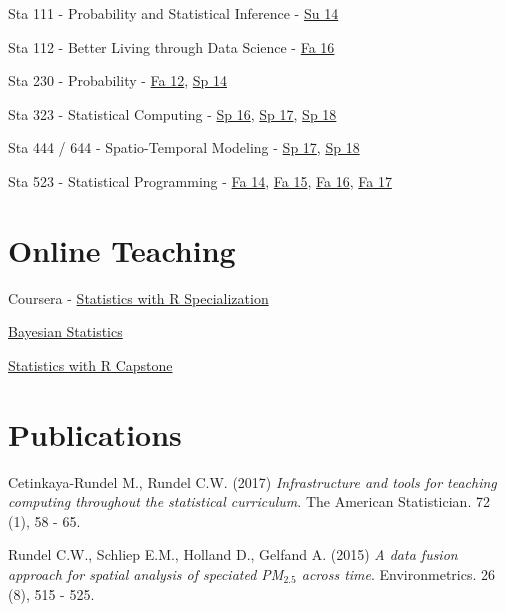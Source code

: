 \documentclass[margin,line]{res}
\begin{document}
\begin{resume}
Sta 111 - Probability and Statistical Inference - \href{https://stat.duke.edu/~cr173/Sta111_Su14/}{Su 14}

Sta 112 - Better Living through Data Science - \href{http://stat.duke.edu/~cr173/Sta112_Fa16/}{Fa 16}

Sta 230 - Probability - \href{http://stat.duke.edu/courses/Spring12/sta104.1}{Fa 12}, \href{https://stat.duke.edu/~cr173/Sta230_Sp14/}{Sp 14}

Sta 323 - Statistical Computing - \href{http://stat.duke.edu/~cr173/Sta323_Sp16/}{Sp 16}, \href{http://stat.duke.edu/~cr173/Sta323_Sp17/}{Sp 17}, \href{http://stat.duke.edu/~cr173/Sta323_Sp18/}{Sp 18}

Sta 444 / 644 - Spatio-Temporal Modeling - \href{http://stat.duke.edu/~cr173/Sta444_Sp17/}{Sp 17}, \href{http://stat.duke.edu/~cr173/Sta444_Sp18/}{Sp 18}

Sta 523 - Statistical Programming - \href{https://stat.duke.edu/~cr173/Sta523_Fa14/}{Fa 14}, \href{https://stat.duke.edu/~cr173/Sta523_Fa15/}{Fa 15}, \href{https://stat.duke.edu/~cr173/Sta523_Fa16/}{Fa 16}, \href{https://stat.duke.edu/~cr173/Sta523_Fa17/}{Fa 17}


\pagebreak


\section{\sc Online Teaching}

Coursera - \href{https://www.coursera.org/specializations/statistics}{Statistics with R Specialization}
\begin{list1}
\item[] \href{https://www.coursera.org/learn/bayesian}{Bayesian Statistics}
\item[] \href{https://www.coursera.org/learn/statistics-project}{Statistics with R Capstone}
\end{list1}

\section{\sc Publications}

Cetinkaya-Rundel M., Rundel C.W. (2017) {\em Infrastructure and tools for teaching computing throughout the statistical curriculum}. The American Statistician. 72 (1), 58 - 65.

\vspace{-0.15cm}
Rundel C.W., Schliep E.M., Holland D., Gelfand A. (2015) {\em A data fusion approach for spatial analysis of speciated PM$_{2.5}$ across time}. Environmetrics. 26 (8), 515 - 525.


\end{resume}
\end{document}
